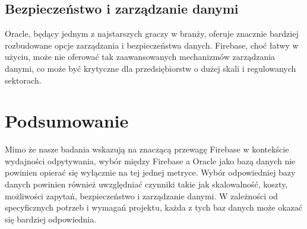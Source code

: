 \subsection{Bezpieczeństwo i zarządzanie danymi}
Oracle, będący jednym z najstarszych graczy w branży, oferuje znacznie bardziej rozbudowane opcje zarządzania i bezpieczeństwa danych. Firebase, choć łatwy w użyciu, może nie oferować tak zaawansowanych mechanizmów zarządzania danymi, co może być krytyczne dla przedsiębiorstw o dużej skali i regulowanych sektorach.

\section{Podsumowanie}
Mimo że nasze badania wskazują na znaczącą przewagę Firebase w kontekście wydajności odpytywania, wybór między Firebase a Oracle jako bazą danych nie powinien opierać się wyłącznie na tej jednej metryce. Wybór odpowiedniej bazy danych powinien również uwzględniać czynniki takie jak skalowalność, koszty, możliwości zapytań, bezpieczeństwo i zarządzanie danymi. W zależności od specyficznych potrzeb i wymagań projektu, każda z tych baz danych może okazać się bardziej odpowiednia.
